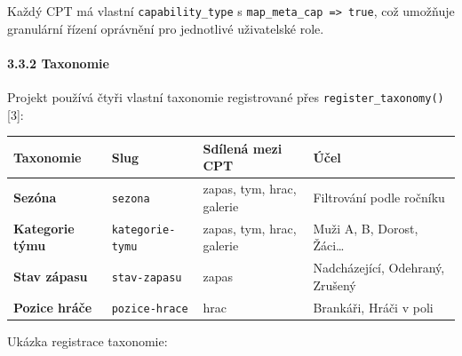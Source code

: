 Každý CPT má vlastní \texttt{capability\_type} s
\texttt{map\_meta\_cap\ =\textgreater{}\ true}, což umožňuje granulární
řízení oprávnění pro jednotlivé uživatelské role.

\paragraph{3.3.2 Taxonomie}\label{taxonomie}

Projekt používá čtyři vlastní taxonomie registrované přes
\texttt{register\_taxonomy()} {[}3{]}:

{\def\LTcaptype{none} %
\begin{longtable}[]{@{}
  >{\raggedright\arraybackslash}p{}
  >{\raggedright\arraybackslash}p{}
  >{\raggedright\arraybackslash}p{}
  >{\raggedright\arraybackslash}p{}@{}}
\toprule\noalign{}
\begin{minipage}[b]{\linewidth}\raggedright
Taxonomie
\end{minipage} & \begin{minipage}[b]{\linewidth}\raggedright
Slug
\end{minipage} & \begin{minipage}[b]{\linewidth}\raggedright
Sdílená mezi CPT
\end{minipage} & \begin{minipage}[b]{\linewidth}\raggedright
Účel
\end{minipage} \\
\midrule\noalign{}
\endhead
\bottomrule\noalign{}
\endlastfoot
\textbf{Sezóna} & \texttt{sezona} & zapas, tym, hrac, galerie &
Filtrování podle ročníku \\
\textbf{Kategorie týmu} & \texttt{kategorie-tymu} & zapas, tym, hrac,
galerie & Muži A, B, Dorost, Žáci\ldots{} \\
\textbf{Stav zápasu} & \texttt{stav-zapasu} & zapas & Nadcházející,
Odehraný, Zrušený \\
\textbf{Pozice hráče} & \texttt{pozice-hrace} & hrac & Brankáři, Hráči v
poli \\
\end{longtable}
}

Ukázka registrace taxonomie:

